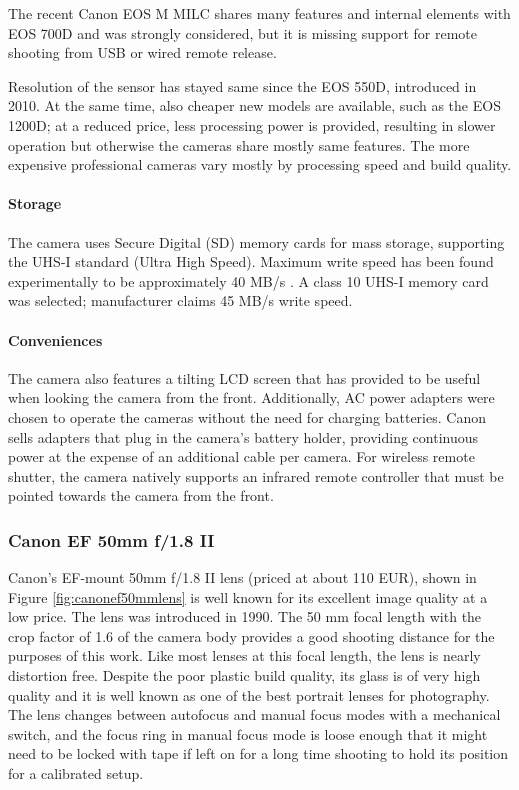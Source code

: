 The recent Canon EOS M MILC shares many features and internal elements with EOS 700D and was strongly considered, but it is missing support for remote shooting from USB or wired remote release.

Resolution of the sensor has stayed same since the EOS 550D, introduced in 2010.
At the same time, also cheaper new models are available, such as the EOS 1200D; at a reduced price, less processing power is provided, resulting in slower operation but otherwise the cameras share mostly same features.
The more expensive professional cameras vary mostly by processing speed and build quality.

\paragraph{Storage}
The camera uses Secure Digital (SD) memory cards for mass storage, supporting the UHS-I standard (Ultra High Speed).
Maximum write speed has been found experimentally to be approximately 40 MB/s \cite{magiclanternforum}.
A class 10 UHS-I memory card was selected; manufacturer claims 45 MB/s write speed.

\paragraph{Conveniences}
The camera also features a tilting LCD screen that has provided to be useful when looking the camera from the front.
Additionally, AC power adapters were chosen to operate the cameras without the need for charging batteries.
Canon sells adapters that plug in the camera's battery holder, providing continuous power at the expense of an additional cable per camera.
For wireless remote shutter, the camera natively supports an infrared remote controller that must be pointed towards the camera from the front.


\subsubsection{Canon EF 50mm f/1.8 II}

Canon's EF-mount 50mm f/1.8 II lens (priced at about 110 EUR), shown in Figure \ref{fig:canonef50mmlens} is well known for its excellent image quality at a low price.
The lens was introduced in 1990.
The 50 mm focal length with the crop factor of 1.6 of the camera body provides a good shooting distance for the purposes of this work.
Like most lenses at this focal length, the lens is nearly distortion free.
Despite the poor plastic build quality, its glass is of very high quality and it is well known as one of the best portrait lenses for photography.
The lens changes between autofocus and manual focus modes with a mechanical switch, and the focus ring in manual focus mode is loose enough that it might need to be locked with tape if left on for a long time shooting to hold its position for a calibrated setup.

